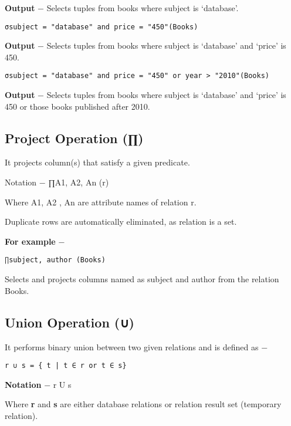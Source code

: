\documentclass[]{article}
\begin{document}
\textbf{Output} − Selects tuples from books where subject is `database'.

\begin{verbatim}
σsubject = "database" and price = "450"(Books)
\end{verbatim}

\textbf{Output} − Selects tuples from books where subject is `database'
and `price' is 450.

\begin{verbatim}
σsubject = "database" and price = "450" or year > "2010"(Books)
\end{verbatim}

\textbf{Output} − Selects tuples from books where subject is `database'
and `price' is 450 or those books published after 2010.

\hypertarget{project-operation}{%
\subsection{Project Operation (∏)}\label{project-operation}}

It projects column(s) that satisfy a given predicate.

Notation − ∏A1, A2, An (r)

Where A1, A2 , An are attribute names of relation r.

Duplicate rows are automatically eliminated, as relation is a set.

\textbf{For example} −

\begin{verbatim}
∏subject, author (Books)
\end{verbatim}

Selects and projects columns named as subject and author from the
relation Books.

\hypertarget{union-operation}{%
\subsection{Union Operation (∪)}\label{union-operation}}

It performs binary union between two given relations and is defined as −

\begin{verbatim}
r ∪ s = { t | t ∈ r or t ∈ s}
\end{verbatim}

\textbf{Notation} − r U s

Where \textbf{r} and \textbf{s} are either database relations or
relation result set (temporary relation).
\end{document}
